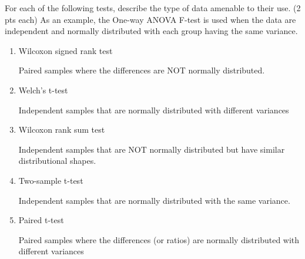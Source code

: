 \documentclass[10pt]{article}
\newcommand{\shortcorrect}[1]{{\color{red} #1}}
\newcommand{\shortcorrect}[1]{{\phantom{33.33}}}
\begin{document}
For each of the following tests, describe the type of data amenable to their use. (2 pts each) As an example, the One-way ANOVA F-test is used when the data are independent and normally distributed with each group having the same variance.
\begin{enumerate}
\item Wilcoxon signed rank test

\shortcorrect{Paired samples where the differences are NOT normally distributed.}\vspace*{1in}

\item Welch's t-test

\shortcorrect{Independent samples that are normally distributed with different variances}\vspace*{1in}

\item Wilcoxon rank sum test

\shortcorrect{Independent samples that are NOT normally distributed but have similar distributional shapes.}\vspace*{1in}

\item Two-sample t-test

\shortcorrect{Independent samples that are normally distributed with the same variance.}\vspace*{1in}

\item Paired t-test

\shortcorrect{Paired samples where the differences (or ratios) are normally distributed with different variances}

\end{enumerate}

\begin{comment}
\newpage
\noindent \begin{Large}``Natural'' selection (10 pts) \end{Large}

To study the effects of natural selection, scientists randomly assigned algae to high and normal levels of carbon dioxide (CO2). The algae were grown at this CO2 level for 1,000 generations. Summaries of the growth rates for alga under these two conditions are given in the table below. Perform the two-sample t-test and make a scientific conclusion about the effect of CO2 level on growth rate. 
\begin{center}

\end{center}
\end{comment}
\end{document}
